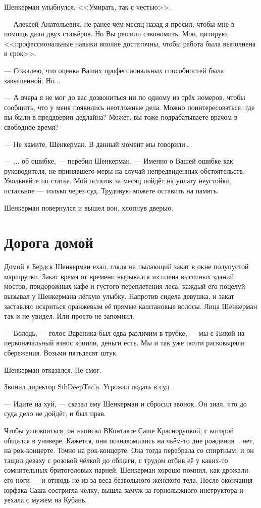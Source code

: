 \documentclass[a4paper,10pt,fleqn]{book}\usepackage{polyglossia}\setdefaultlanguage{english}\setotherlanguage{russian}\defaultfontfeatures{Ligatures=TeX,Mapping=tex-text} \usepackage{xcolor}\definecolor{lightgray}{HTML}{bbbbbb}\color{lightgray}\newcommand{\ml}[3]{\textcolor{black}{#3}}
\begin{document}
Шенкерман улыбнулся.
<<Умирать, так с честью>>.

--- Алексей Анатольевич, не ранее чем месяц назад я просил, чтобы мне в помощь дали двух стажёров.
Но Вы решили сэкономить.
Мои, цитирую, <<профессиональные навыки вполне достаточны, чтобы работа была выполнена в срок>>.

--- Сожалею, что оценка Ваших профессиональных способностей была завышенной.
Но...

--- А вчера я не мог до вас дозвониться ни по одному из трёх номеров, чтобы сообщить, что у меня появились неотложные дела.
Можно поинтересоваться, где вы были в преддверии дедлайна?
Может, вы тоже подрабатываете врачом в свободное время?

--- Не хамите, Шенкерман.
В данный момент мы говорили\ldots

---  ... об ошибке, --- перебил Шенкерман.
--- Именно о Вашей ошибке как руководителя, не принявшего меры на случай непредвиденных обстоятельств.
Увольняйте по статье.
Мой остаток за месяц пойдёт на уплату неустойки, остальное --- только через суд.
Трудовую можете оставить на память.

Шенкерман повернулся и вышел вон, хлопнув дверью.

\section{Дорога домой}

Домой в Бердск Шенкерман ехал, глядя на пылающий закат в окне полупустой маршрутки.
Закат время от времени вырывался из плена высотных зданий, мостов, придорожных кафе и густого переплетения леса;
каждый его поцелуй вызывал у Шенкермана лёгкую улыбку.
Напротив сидела девушка, и закат заставлял искриться оранжевым её прямые каштановые волосы.
Лица Шенкерман так и не увидел.
Или просто не запомнил.

--- Володь, --- голос Вареника был едва различим в трубке, --- мы с Никой на первоначальный взнос копили, деньги есть.
Мы и так уже почти расковыряли сбережения.
Возьми пятьдесят штук.

Шенкерман отказался.
Не смог.

Звонил директор SibDeepTec'а.
Угрожал подать в суд.

--- Идите на хуй, --- сказал ему Шенкерман и сбросил звонок.
Он знал, что до суда дело не дойдёт, и был прав.

Чтобы успокоиться, он написал ВКонтакте Саше Красноруцкой, с которой общался в универе.
Кажется, они познакомились на чьём-то дне рождения... нет, на рок-концерте.
Точно на рок-концерте.
Она тогда перебрала со спиртным, и он тащил деваху с розовой чёлкой до общаги, с трудом отбив её у каких-то сомнительных бритоголовых парней.
Шенкерман хорошо помнил, как дрожали его ноги --- и отнюдь не из-за веса безвольного женского тела.
После окончания юрфака Саша состригла чёлку, вышла замуж за горнолыжного инструктора и уехала с мужем на Кубань.
\end{document}
